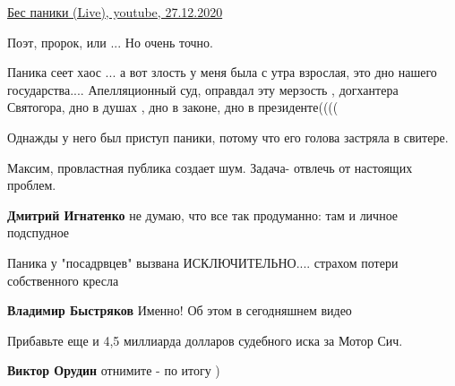 \begin{itemize}

\href{https://youtu.be/mKCnJNLkmzk}{%
Бес паники (Live), youtube, 27.12.2020%
}

Поэт, пророк, или ...
Но очень точно.


Паника сеет хаос ... а вот злость у меня была с утра взрослая, это дно нашего
государства.... Апелляционный суд, оправдал эту мерзость , догхантера Святогора,
дно в душах , дно в законе, дно в президенте((((


Однажды у него был приступ паники, потому что его голова застряла в свитере.

Максим, провластная публика создает шум. Задача- отвлечь от настоящих проблем.

\textbf{Дмитрий Игнатенко} не думаю, что все так продуманно: там и личное подспудное


Паника у "посадрвцев" вызвана ИСКЛЮЧИТЕЛЬНО.... страхом потери собственного
кресла

\textbf{Владимир Быстряков} Именно! Об этом в сегодняшнем видео

Прибавьте еще и 4,5 миллиарда долларов судебного иска за Мотор Сич.

\textbf{Виктор Орудин} отнимите - по итогу )

\end{itemize} %
